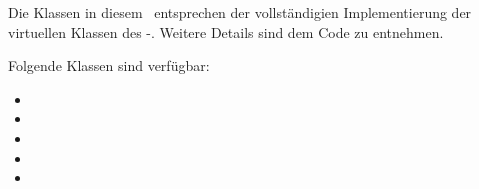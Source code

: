 
Die Klassen in diesem \Pack\ entsprechen der vollständigien Implementierung der virtuellen Klassen des \textit{}-\Pack. Weitere Details sind dem Code zu entnehmen.

Folgende Klassen sind verfügbar:
\begin{itemize}
\item {}
\item {}
\item {}
\item {}
\item {}
\end{itemize}





